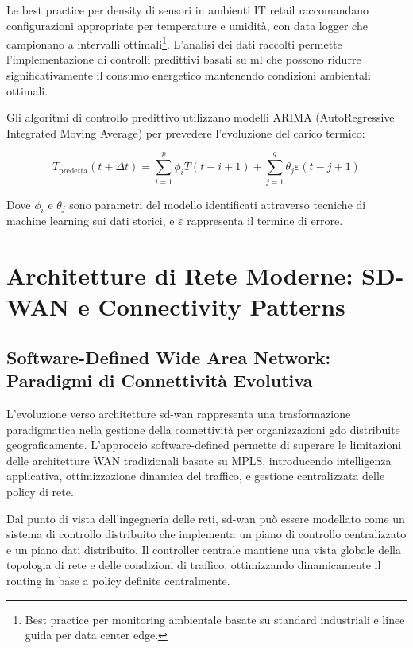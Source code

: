 Le best practice per density di sensori in ambienti IT retail raccomandano configurazioni appropriate per temperature e umidità, con data logger che campionano a intervalli ottimali\footnote{Best practice per monitoring ambientale basate su standard industriali e linee guida per data center edge.}. L'analisi dei dati raccolti permette l'implementazione di controlli predittivi basati su \gls{ml} che possono ridurre significativamente il consumo energetico mantenendo condizioni ambientali ottimali.

Gli algoritmi di controllo predittivo utilizzano modelli ARIMA (AutoRegressive Integrated Moving Average) per prevedere l'evoluzione del carico termico:

\begin{equation}
T_{\text{predetta}}(t+\Delta t) = \sum_{i=1}^{p} \phi_i T(t-i+1) + \sum_{j=1}^{q} \theta_j \varepsilon(t-j+1)
\label{eq:arima-prediction}
\end{equation}

Dove $\phi_i$ e $\theta_j$ sono parametri del modello identificati attraverso tecniche di machine learning sui dati storici, e $\varepsilon$ rappresenta il termine di errore.

\section{Architetture di Rete Moderne: SD-WAN e Connectivity Patterns}
\label{sec:architetture-rete}

\subsection{Software-Defined Wide Area Network: Paradigmi di Connettività Evolutiva}
\label{subsec:sd-wan}

L'evoluzione verso architetture \gls{sd-wan} rappresenta una trasformazione paradigmatica nella gestione della connettività per organizzazioni \gls{gdo} distribuite geograficamente. L'approccio software-defined permette di superare le limitazioni delle architetture WAN tradizionali basate su MPLS, introducendo intelligenza applicativa, ottimizzazione dinamica del traffico, e gestione centralizzata delle policy di rete.

Dal punto di vista dell'ingegneria delle reti, \gls{sd-wan} può essere modellato come un sistema di controllo distribuito che implementa un piano di controllo centralizzato e un piano dati distribuito. Il controller centrale mantiene una vista globale della topologia di rete e delle condizioni di traffico, ottimizzando dinamicamente il routing in base a policy definite centralmente.

